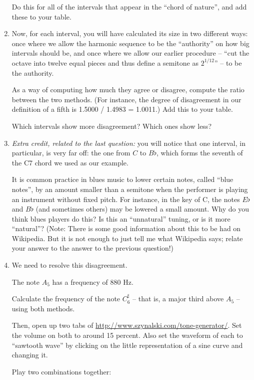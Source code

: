 \documentclass[12pt]{article}
\begin{document}
\begin{enumerate}
	Do this for all of the intervals that appear in the ``chord of nature'', and add these to your table.

      \item Now, for each interval, you will have calculated its size in two different ways: once where we allow the harmonic sequence to be the ``authority'' on how big intervals should be,
	and once where we allow our earlier procedure -- ``cut the octave into twelve equal pieces and thus define a semitone as $2^{1/12}$'' -- to be the authority.

	As a way of computing how much they agree or disagree, compute the ratio between the two methods. (For instance, the degree of disagreement in our definition
	of a fifth is 1.5000 / 1.4983 = 1.0011.) Add this to your table.

	Which intervals show more disagreement? Which ones show less?

      \item {\it Extra credit, related to the last question:} you will notice that one interval, in particular, is very far off: the one from $C$ to $B\flat$, which 
	forms the seventh of the C7 chord we used as our example.

	It is common practice in blues music to lower certain notes, called ``blue notes'', by an amount smaller than a semitone when the performer is playing an instrument
	without fixed pitch. For instance, in the key of C, the notes $E\flat$ and $B\flat$ (and sometimes others) may be lowered a small amount. Why do you think blues players
	do this? Is this an ``unnatural'' tuning, or is it more ``natural''? (Note: There is some good information about this to be had on Wikipedia. But it is not enough to 
	just tell me what Wikipedia says; relate your answer to the answer to the previous question!)
	
      \item We need to resolve this disagreement.

	The note $A_5$ has a frequency of 880 Hz.

	Calculate the frequency of the note $C^\sharp_6$ -- that is, a major third above $A_5$ -- using both methods. 
	
	Then, open up two tabs of \url {http://www.szynalski.com/tone-generator/}. Set the volume on both to around 15 percent. Also set the waveform of each to ``sawtooth wave'' by clicking on the little representation of a sine curve and changing it.

	Play two combinations together:


\end{enumerate}
\end{document}

